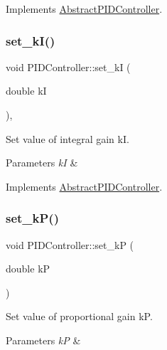 Implements \hyperlink{classAbstractPIDController}{Abstract\+P\+I\+D\+Controller}.

\mbox{\label{classPIDController_a5724db51f8d64e8adf5c6f466dc66d8c}} 
\subsubsection{\texorpdfstring{set\+\_\+k\+I()}{set\_kI()}}
{\footnotesize\ttfamily void P\+I\+D\+Controller\+::set\+\_\+kI (\begin{DoxyParamCaption}\item[{double}]{kI }\end{DoxyParamCaption})\hspace{0.3cm}{\ttfamily [override]}, {\ttfamily [virtual]}}



Set value of integral gain kI. 


\begin{DoxyParams}{Parameters}
{\em kI} & \\
\hline
\end{DoxyParams}


Implements \hyperlink{classAbstractPIDController}{Abstract\+P\+I\+D\+Controller}.

\mbox{\label{classPIDController_a7b97f2fa293347e9e9391d5ca3b80e8b}} 
\subsubsection{\texorpdfstring{set\+\_\+k\+P()}{set\_kP()}}
{\footnotesize\ttfamily void P\+I\+D\+Controller\+::set\+\_\+kP (\begin{DoxyParamCaption}\item[{double}]{kP }\end{DoxyParamCaption})\hspace{0.3cm}{\ttfamily [virtual]}}



Set value of proportional gain kP. 


\begin{DoxyParams}{Parameters}
{\em kP} & \\
\hline
\end{DoxyParams}


